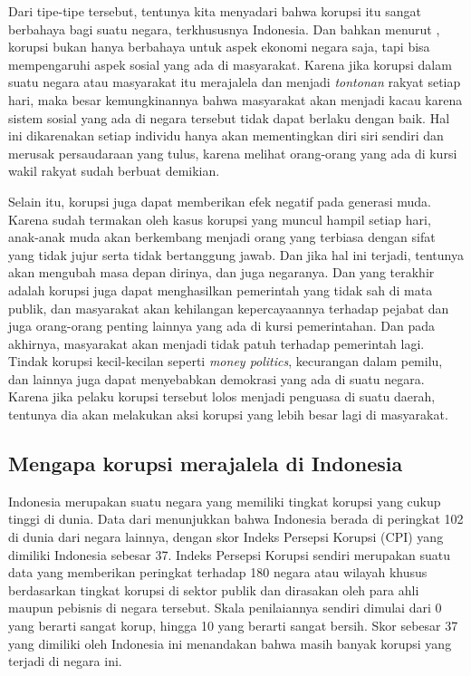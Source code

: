 \documentclass[11pt]{article}
\begin{document}
Dari tipe-tipe tersebut, tentunya kita menyadari bahwa korupsi itu sangat berbahaya
bagi suatu negara, terkhususnya Indonesia. Dan bahkan menurut
\citeauthor*{setiadiKORUPSIDIINDONESIA2018}, korupsi bukan hanya berbahaya
untuk aspek ekonomi negara saja, tapi bisa mempengaruhi aspek sosial yang ada
di masyarakat. Karena jika korupsi dalam suatu negara atau masyarakat itu merajalela
dan menjadi \emph{tontonan} rakyat setiap hari, maka besar kemungkinannya bahwa
masyarakat akan menjadi kacau karena sistem sosial yang ada di negara tersebut
tidak dapat berlaku dengan baik. Hal ini dikarenakan setiap individu hanya akan
mementingkan diri siri sendiri dan merusak persaudaraan yang tulus, karena melihat 
orang-orang yang ada di kursi wakil rakyat sudah berbuat demikian.

Selain itu, korupsi juga dapat memberikan efek negatif pada generasi muda.
Karena sudah termakan oleh kasus korupsi yang muncul hampil setiap hari,
anak-anak muda akan berkembang menjadi orang yang terbiasa dengan sifat yang tidak jujur serta tidak bertanggung
jawab. Dan jika hal ini terjadi, tentunya akan mengubah masa depan dirinya, dan 
juga negaranya. Dan yang terakhir adalah korupsi juga dapat menghasilkan pemerintah
yang tidak sah di mata publik, dan masyarakat akan kehilangan kepercayaannya terhadap
pejabat dan juga orang-orang penting lainnya yang ada di kursi pemerintahan. Dan
pada akhirnya, masyarakat akan menjadi tidak patuh terhadap pemerintah lagi.
Tindak korupsi kecil-kecilan seperti \emph{money politics}, kecurangan dalam pemilu,
dan lainnya juga dapat menyebabkan demokrasi yang ada di suatu negara. Karena 
jika pelaku korupsi tersebut lolos menjadi penguasa di suatu daerah, tentunya
dia akan melakukan aksi korupsi yang lebih besar lagi di masyarakat.

\subsection{Mengapa korupsi merajalela di Indonesia}
Indonesia merupakan suatu negara yang memiliki tingkat korupsi yang cukup tinggi 
di dunia. Data dari \citeauthor{transparencyinternationalCorruptionPerceptionsIndex2020}
menunjukkan bahwa Indonesia berada di peringkat 102 di dunia dari negara lainnya,
dengan skor Indeks Persepsi Korupsi (CPI) yang dimiliki Indonesia sebesar 37. 
Indeks Persepsi Korupsi sendiri merupakan suatu data yang memberikan peringkat 
terhadap 180 negara atau wilayah khusus berdasarkan tingkat korupsi di sektor publik
dan dirasakan oleh para ahli maupun pebisnis di negara tersebut. Skala penilaiannya
sendiri dimulai dari 0 yang berarti sangat korup, hingga 10 yang berarti sangat
bersih. Skor sebesar 37 yang dimiliki oleh Indonesia ini menandakan bahwa masih
banyak korupsi yang terjadi di negara ini. 
\end{document}
